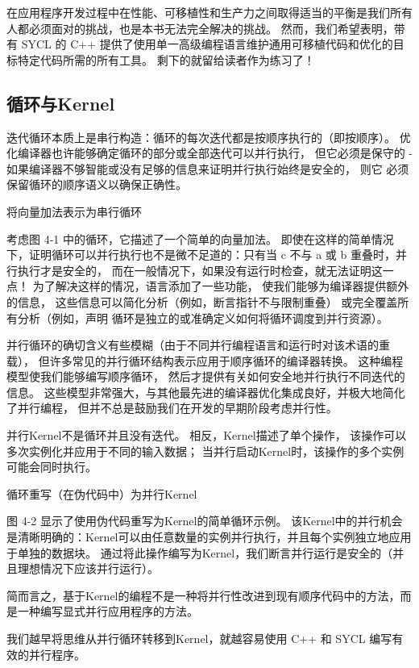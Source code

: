 在应用程序开发过程中在性能、可移植性和生产力之间取得适当的平衡是我们所有人都必须面对的挑战，也是本书无法完全解决的挑战。 
然而，我们希望表明，带有 SYCL 的 C++ 提供了使用单一高级编程语言维护通用可移植代码和优化的目标特定代码所需的所有工具。 
剩下的就留给读者作为练习了！

\subsection{循环与Kernel}
迭代循环本质上是串行构造：循环的每次迭代都是按顺序执行的（即按顺序）。 
优化编译器也许能够确定循环的部分或全部迭代可以并行执行，
但它必须是保守的 - 如果编译器不够智能或没有足够的信息来证明并行执行始终是安全的，
则它 必须保留循环的顺序语义以确保正确性。

{\color{red} 将向量加法表示为串行循环 }

考虑图 4-1 中的循环，它描述了一个简单的向量加法。 
即使在这样的简单情况下，证明循环可以并行执行也不是微不足道的：只有当 c 不与 a 或 b 重叠时，并行执行才是安全的，
而在一般情况下，如果没有运行时检查，就无法证明这一点！ 为了解决这样的情况，语言添加了一些功能，
使我们能够为编译器提供额外的信息，
这些信息可以简化分析（例如，断言指针不与限制重叠）
或完全覆盖所有分析（例如，声明 循环是独立的或准确定义如何将循环调度到并行资源）。

并行循环的确切含义有些模糊（由于不同并行编程语言和运行时对该术语的重载），
但许多常见的并行循环结构表示应用于顺序循环的编译器转换。 这种编程模型使我们能够编写顺序循环，
然后才提供有关如何安全地并行执行不同迭代的信息。 
这些模型非常强大，与其他最先进的编译器优化集成良好，并极大地简化了并行编程，
但并不总是鼓励我们在开发的早期阶段考虑并行性。

并行Kernel不是循环并且没有迭代。 相反，Kernel描述了单个操作，
该操作可以多次实例化并应用于不同的输入数据； 当并行启动Kernel时，该操作的多个实例可能会同时执行。

{\color{red} 循环重写（在伪代码中）为并行Kernel}

图 4-2 显示了使用伪代码重写为Kernel的简单循环示例。 
该Kernel中的并行机会是清晰明确的：Kernel可以由任意数量的实例并行执行，并且每个实例独立地应用于单独的数据块。 
通过将此操作编写为Kernel，我们断言并行运行是安全的（并且理想情况下应该并行运行）。

简而言之，基于Kernel的编程不是一种将并行性改进到现有顺序代码中的方法，而是一种编写显式并行应用程序的方法。

\begin{remark}
	我们越早将思维从并行循环转移到Kernel，就越容易使用 C++ 和 SYCL 编写有效的并行程序。
\end{remark}

